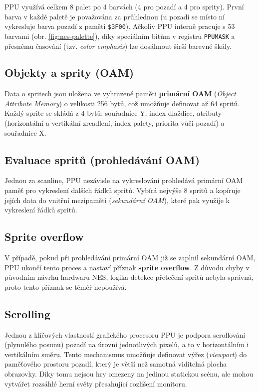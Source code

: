 PPU využívá celkem 8 palet po 4 barvách (4 pro pozadí a 4 pro sprity). První barva v každé paletě je
považována za průhlednou (u pozadí se místo ní vykresluje barva pozadí z paměti \texttt{\$3F00}).
Ačkoliv PPU interně pracuje s 53 barvami (obr. \ref{fig:nes-palette}), díky speciálním bitům v
registru \texttt{PPUMASK} a přesnému časování (tzv. \textit{color emphasis}) lze dosáhnout širší
barevné škály.\cite{nes-palettes-tricks}

\subsection{Objekty a sprity (OAM)}

Data o spritech jsou uložena ve vyhrazené paměti \textbf{primární OAM}
(\textit{Object Attribute Memory}) o velikosti 256 bytů, což umožňuje definovat až 64 spritů. Každý
sprite se skládá z 4 bytů: souřadnice Y, index dlaždice, atributy (horizontální a vertikální
zrcadlení, index palety, priorita vůči pozadí) a souřadnice X.

\subsection{Evaluace spritů (prohledávání OAM)}
\label{tp:sprite-eval}

Jednou za scanline, PPU nezávisle na vykreslování prohledává primární OAM paměť pro vykreslení
dalších řádků spritů. Vybírá nejvýše 8 spritů a kopíruje jejích data do vnitřní mezipaměti
(\textit{sekundární OAM}), které pak využije k vykreslení řádků spritů.

\subsection{Sprite overflow}

V případě, pokud při prohledávání primární OAM již se zaplnil sekundární OAM, PPU ukončí tento
proces a nastaví příznak \textbf{sprite overflow}. Z důvodu chyby v původním návrhu hardwaru NES,
logika detekce přetečení spritů nebyla správná, proto tento příznak se téměř nepoužívá.

\subsection{Scrolling}

Jednou z klíčových vlastností grafického procesoru PPU je podpora scrollování (plynulého posunu)
pozadí na úrovni jednotlivých pixelů, a to v horizontálním i vertikálním směru. Tento mechanismus
umožňuje definovat výřez (\textit{viewport}) do paměťového prostoru pozadí, který je větší než
samotná viditelná plocha obrazovky. Díky tomu nejsou hry omezeny na jedinou statickou scénu, ale
mohou vytvářet rozsáhlé herní světy přesahující rozlišení monitoru.

